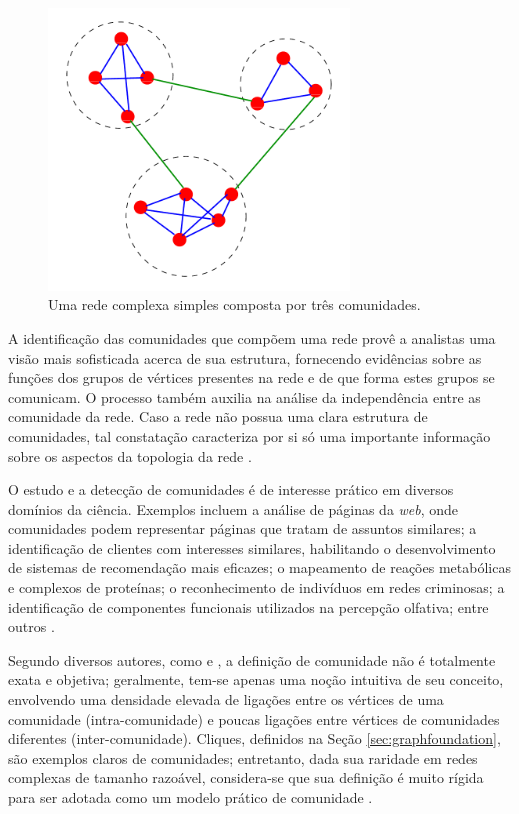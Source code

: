 \begin{figure}[ht]
    \centering
    \includegraphics[width=8cm]{imagens/communities.png}
    \caption{Uma rede complexa simples composta por três comunidades.}
    \label{fig:communitystructure}
\end{figure}

A identificação das comunidades que compõem uma rede provê a analistas uma visão mais sofisticada acerca de sua estrutura, fornecendo evidências sobre as funções dos grupos de vértices presentes na rede e de que forma estes grupos se comunicam. O processo também auxilia na análise da independência entre as comunidade da rede. Caso a rede não possua uma clara estrutura de comunidades, tal constatação caracteriza por si só uma importante informação sobre os aspectos da topologia da rede \cite{Newman2006}.

O estudo e a detecção de comunidades é de interesse prático em diversos domínios da ciência. Exemplos incluem a análise de páginas da \textit{web}, onde comunidades podem representar páginas que tratam de assuntos similares; a identificação de clientes com interesses similares, habilitando o desenvolvimento de sistemas de recomendação mais eficazes; o mapeamento de reações metabólicas e complexos de proteínas; o reconhecimento de indivíduos em redes criminosas; a identificação de componentes funcionais utilizados na percepção olfativa; entre outros \cite{Newman2006,Fortunato2010,Santiago2017}.

Segundo diversos autores, como  e , a definição de comunidade não é totalmente exata e objetiva; geralmente, tem-se apenas uma noção intuitiva de seu conceito, envolvendo uma densidade elevada de ligações entre os vértices de uma comunidade (intra-comunidade) e poucas ligações entre vértices de comunidades diferentes (inter-comunidade). Cliques, definidos na Seção \ref{sec:graphfoundation}, são exemplos claros de comunidades; entretanto, dada sua raridade em redes complexas de tamanho razoável, considera-se que sua definição é muito rígida para ser adotada como um modelo prático de comunidade \cite{Fortunato2007}.

